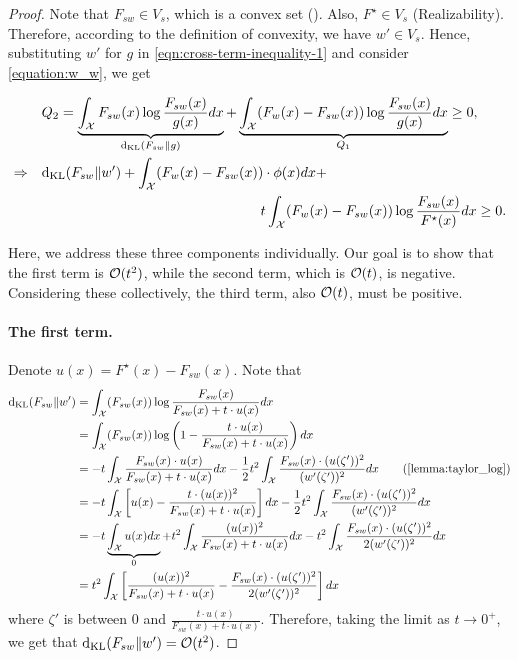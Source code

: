 \begin{proof}
Note that $F_{sw} \in V_s$, which is a convex set ().
Also, $F^\star \in V_s$ (Realizability).
Therefore, according to the definition of convexity,
we have $w' \in V_s$. 
Hence, substituting $w'$ for $g$ in \eqref{eqn:cross-term-inequality-1} and consider \cref{equation:w_w}, we get

\begin{align}
    & Q_2 = \underbrace{\int_{\cX} F_{sw}(x) \log \frac{F_{sw}(x)}{g(x)} d x}_{\kl(F_{sw} \| g)} + \underbrace{\int_{\cX} (F_w(x) - F_{sw}(x)) \log \frac{F_{sw}(x)}{g(x)} d x}_{Q_1} \ge 0, \nonumber \\
    \Rightarrow \quad & \kl(F_{sw} \| w') + \int_{\cX} (F_w(x) - F_{sw}(x)) \cdot \phi(x) d x + \nonumber \\ & \hspace{5.5cm} t \int_{\cX} (F_w(x) - F_{sw}(x)) \log \frac{F_{sw}(x)}{F^\star(x)} d x \ge 0. \label{discriminant}
\end{align}

Here, we address these three components individually.
Our goal is to show that the first term is $\mathcal{O}(t^2)$, while the second term, which is $\mathcal{O}(t)$, is negative. Considering these collectively, the third term, also $\mathcal{O}(t)$, must be positive.


\paragraph{The first term.}
Denote $u(x)=F^\star(x) - F_{sw}(x)$. Note that 
\begin{align*}
\kl(F_{sw} \| w') & = \int_{\cX} (F_{sw}(x)) \log \frac{F_{sw}(x)}{F_{sw}(x) + t \cdot u(x)} d x 
\\ & = \int_{\cX} (F_{sw}(x)) \log \left( 1-\frac{t \cdot u(x)}{F_{sw}(x) + t \cdot u(x)} \right) d x 
\\ & = -t \int_{\cX} \frac{F_{sw}(x) \cdot u(x)}{F_{sw}(x) + t \cdot u(x)} d x - \frac{1}{2}t^2 \int_{\cX} \frac{F_{sw}(x) \cdot (u(\zeta'))^2}{(w'(\zeta'))^2} d x \tag{\cref{lemma:taylor_log}}
\\ & = -t \int_{\cX} \left[ u(x)- \frac{t \cdot (u(x))^2}{F_{sw}(x) + t \cdot u(x)} \right] d x - \frac{1}{2}t^2 \int_{\cX} \frac{F_{sw}(x) \cdot (u(\zeta'))^2}{(w'(\zeta'))^2} d x
\\ & = -t \underbrace{\int_{\cX} u(x) d x}_{0} + t^2 \int_{\cX} \frac{(u(x))^2}{F_{sw}(x) + t \cdot u(x)} d x - t^2 \int_{\cX} \frac{F_{sw}(x) \cdot (u(\zeta'))^2}{2(w'(\zeta'))^2} d x
\\ & = t^2 \int_{\cX} \left[ \frac{(u(x))^2}{F_{sw}(x) + t \cdot u(x)}-\frac{F_{sw}(x) \cdot (u(\zeta'))^2}{2(w'(\zeta'))^2} \right] d x
\end{align*}
where $\zeta'$ is between $0$ and $\frac{t \cdot u(x)}{F_{sw}(x) + t \cdot u(x)}$.
Therefore, taking the limit as $t \to 0^+$, we get that $\mathrm{d}_{\mathrm{KL}}(F_{sw} \| w') = \mathcal{O} (t^2)$. 


\end{proof}
